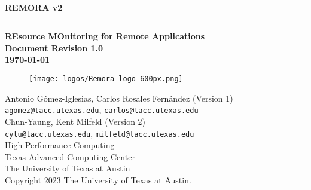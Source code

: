 \documentclass[10pt,a4paper]{report}
\begin{document}
\begin{titlepage}
\thispagestyle{empty}	%
\verb+ +
\vspace{1em}
\begin{flushright}
\huge\bf REMORA v2\\
\rule{\textwidth}{4pt}
\large{\bf REsource MOnitoring for Remote Applications\\
Document Revision 1.0\\
\today}
\end{flushright}

\begin{figure}[ht!]
	\centering
	\texttt{[image: logos/Remora-logo-600px.png]}
\end{figure}

\newpage
\thispagestyle{empty}
\begin{flushleft}
Antonio G\'omez-Iglesias, Carlos Rosales Fern\'andez (Version 1)\\
\verb+agomez@tacc.utexas.edu+, \verb+carlos@tacc.utexas.edu+\\
\vspace{0.5em}
Chun-Yaung, Kent Milfeld (Version 2)\\
\verb+cylu@tacc.utexas.edu+, \verb+milfeld@tacc.utexas.edu+\\

\vspace{0.5em}
High Performance Computing \\
Texas Advanced Computing Center\\
The University of Texas at Austin\\
\vspace{1cm}
Copyright 2023 The University of Texas at Austin.
\end{flushleft}
\newpage
\end{titlepage}
\end{document}
